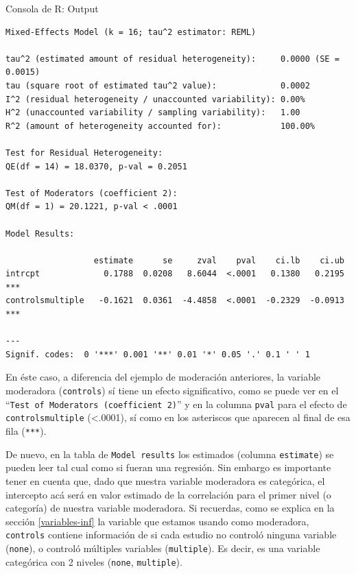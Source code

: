 \documentclass[
  bookmarksnumbered]{article}
\begin{document}
\begin{ROut}{Consola de R: Output~\thetcbcounter}
                \begin{footnotesize}
                \begin{verbatim} 
Mixed-Effects Model (k = 16; tau^2 estimator: REML)

tau^2 (estimated amount of residual heterogeneity):     0.0000 (SE = 0.0015)
tau (square root of estimated tau^2 value):             0.0002
I^2 (residual heterogeneity / unaccounted variability): 0.00%
H^2 (unaccounted variability / sampling variability):   1.00
R^2 (amount of heterogeneity accounted for):            100.00%

Test for Residual Heterogeneity:
QE(df = 14) = 18.0370, p-val = 0.2051

Test of Moderators (coefficient 2):
QM(df = 1) = 20.1221, p-val < .0001

Model Results:

                  estimate      se     zval    pval    ci.lb    ci.ub      
intrcpt             0.1788  0.0208   8.6044  <.0001   0.1380   0.2195  *** 
controlsmultiple   -0.1621  0.0361  -4.4858  <.0001  -0.2329  -0.0913  *** 

---
Signif. codes:  0 '***' 0.001 '**' 0.01 '*' 0.05 '.' 0.1 ' ' 1
 \end{verbatim}
                \end{footnotesize}
                \end{ROut}

En éste caso, a diferencia del ejemplo de moderación anteriores, la variable moderadora (\texttt{controls}) sí tiene un efecto significativo, como se puede ver en el ``\texttt{Test\ of\ Moderators\ (coefficient\ 2)}'' y en la columna \texttt{pval} para el efecto de \texttt{controlsmultiple} (\textless.0001), sí como en los asteriscos que aparecen al final de esa fila (\texttt{***}).

De nuevo, en la tabla de \texttt{Model\ results} los estimados (columna \texttt{estimate}) se pueden leer tal cual como si fueran una regresión. Sin embargo es importante tener en cuenta que, dado que nuestra variable moderadora es categórica, el intercepto acá será en valor estimado de la correlación para el primer nivel (o categoría) de nuestra variable moderadora. Si recuerdas, como se explica en la sección \ref{variables-inf} la variable que estamos usando como moderadora, \texttt{controls} contiene información de si cada estudio no controló ninguna variable (\texttt{none}), o controló múltiples variables (\texttt{multiple}). Es decir, es una variable categórica con 2 niveles (\texttt{none}, \texttt{multiple}).
\end{document}
